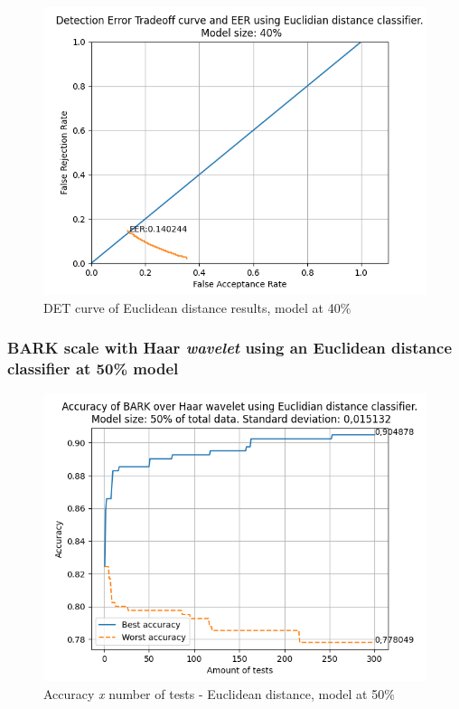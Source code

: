 			\begin{figure}[H]
				\centering
				\includegraphics[scale=.6]{images/results/det/DET_for_classifier_Euclidian_40}
				\caption{DET curve of Euclidean distance results, model at 40\%}
				\label{fig:detforclassifiereuclidian40}
			\end{figure}
		
			
		
		\subsubsection{BARK scale with Haar \textit{wavelet} using an Euclidean distance classifier at 50\% model}
		
			\begin{figure}[H]
				\centering
				\includegraphics[scale=.6]{images/results/confusionMatrices/classifier_Euclidian_50}
				\caption{Accuracy \textit{x} number of tests - Euclidean distance, model at 50\%}
				\label{fig:classifiereuclidian50}
			\end{figure}
			
